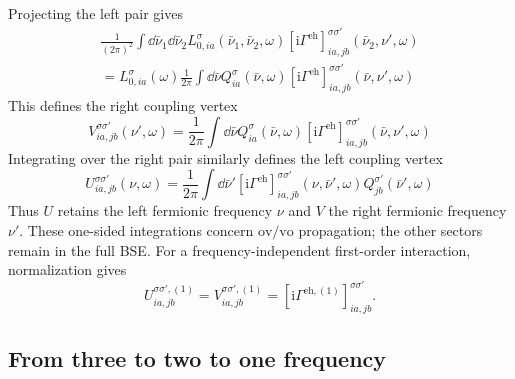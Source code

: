 \documentclass[aip,jcp,reprint,noshowkeys,superscriptaddress]{revtex4-1}
\newcommand{\ii}{\mathrm{i}}
\newcommand{\eh}{\text{eh}}
\begin{document}
Projecting the left pair gives
\begin{multline}
	\frac{1}{(2\pi)^2}
	\int \dd{\bar\nu_1}\dd{\bar\nu_2}
	L_{0,ia}^{\sigma}(\bar\nu_1,\bar\nu_2,\omega)
	\left[
	\ii\Gamma^\eh
	\right]^{\sigma\sigma'}_{ia,jb}(\bar\nu_2,\nu',\omega)
	\\
	=
	L_{0,ia}^\sigma(\omega)
	\frac{1}{2\pi}
	\int \dd{\bar\nu}
	Q^\sigma_{ia}(\bar\nu,\omega)
	\left[
	\ii\Gamma^\eh
	\right]^{\sigma\sigma'}_{ia,jb}(\bar\nu,\nu',\omega)
	\label{eq:BSE_right_factorization}
\end{multline}
This defines the right coupling vertex
\begin{equation}
	V^{\sigma\sigma'}_{ia,jb}(\nu',\omega)
	=
	\frac{1}{2\pi}
	\int \dd{\bar\nu}
	Q^\sigma_{ia}(\bar\nu,\omega)
	\left[
	\ii\Gamma^\eh
	\right]^{\sigma\sigma'}_{ia,jb}(\bar\nu,\nu',\omega)
	\label{eq:V_def}
\end{equation}
Integrating over the right pair similarly defines the left coupling vertex
\begin{equation}
	U^{\sigma\sigma'}_{ia,jb}(\nu,\omega)
	=
	\frac{1}{2\pi}
	\int \dd{\bar\nu'}
	\left[
	\ii\Gamma^\eh
	\right]^{\sigma\sigma'}_{ia,jb}(\nu,\bar\nu',\omega)
	Q^{\sigma'}_{jb}(\bar\nu',\omega)
	\label{eq:U_def}
\end{equation}
Thus $U$ retains the left fermionic frequency $\nu$ and $V$ the right
fermionic frequency $\nu'$. These one-sided integrations concern
$\text{ov}/\text{vo}$ propagation; the other sectors remain in the full BSE.
For a frequency-independent first-order interaction, normalization gives
\begin{equation}
    U^{\sigma\sigma',(1)}_{ia,jb}
    =V^{\sigma\sigma',(1)}_{ia,jb}
    =[\ii\Gamma^{\eh,(1)}]^{\sigma\sigma'}_{ia,jb}.
    \label{eq:bare_projection_normalization}
\end{equation}

\subsection{From three to two to one frequency}
\end{document}
